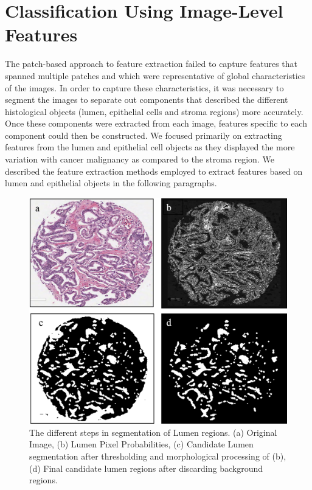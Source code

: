 \section{Classification Using Image-Level Features}
The patch-based approach to feature extraction failed to capture features that spanned multiple patches and which were representative of global characteristics of the images. 
In order to capture these characteristics, it was necessary to segment the images to separate out components that described the different histological objects (lumen, epithelial cells and stroma regions) more accurately. Once these components were extracted from each image, features specific to each component could then be constructed. We focused primarily on extracting features from the lumen and epithelial cell objects as they displayed the more variation with cancer malignancy as compared to the stroma region. We described the feature extraction methods employed to extract features based on lumen and epithelial objects in the following paragraphs.

\begin{figure}[!htb]
\centering
\includegraphics[scale=0.3]{figs/lumen_processing.png}
\caption{The different steps in segmentation of Lumen regions. (a) Original Image, (b) Lumen Pixel Probabilities, (c) Candidate Lumen segmentation after thresholding and morphological processing of (b), (d) Final candidate lumen regions after discarding background regions.}
\label{fig:lumen_extraction_process}
\centering
\end{figure}



